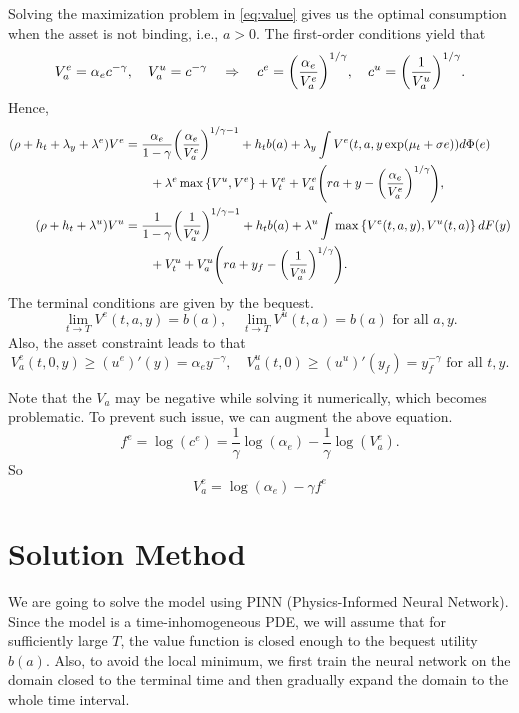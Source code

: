 \documentclass[a4paper, 12pt]{article}
\begin{document}
Solving the maximization problem in \cref{eq:value} gives us the optimal consumption 
when the asset is not binding, i.e., $a>0$. The first-order conditions yield that 
\begin{equation}
    V_a^e = \alpha_e c^{-\gamma}, \quad V_a^u = c^{-\gamma} 
    \quad \Rightarrow\quad 
    c^e = \pth{\frac{\alpha_e}{V^e_a}}^{1/\gamma}, \quad 
    c^u = \pth{\frac{1}{V^u_a}}^{1/\gamma}.
\end{equation}
Hence, 
\begin{align}
    (\rho + h_t + \lambda_y + \lambda^e)V^e &= \frac{\alpha_e}{1-\gamma}\pth{\frac{\alpha_e}{V^e_a}}^{1/\gamma - 1} + h_tb(a) + \lambda_y\int V^e(t,a,y\exp(\mu_t + \sigma e))d\Phi(e) \nonumber \\
    &\qquad + \lambda^e\max\set{V^u, V^e} + V^e_t + V^e_a\pth{ra + y - \pth{\frac{\alpha_e}{V^e_a}}^{1/\gamma}}, \label{eq:value_e}\\
    (\rho + h_t + \lambda^u)V^u &= \frac{1}{1-\gamma}\pth{\frac{1}{V^u_a}}^{1/\gamma - 1} + h_tb(a) + \lambda^u\int \max\set{V^e(t,a,y), V^u(t,a)}dF(y) \nonumber \\
    &\qquad + V^u_t + V^u_a\pth{ra + y_f - \pth{\frac{1}{V^u_a}}^{1/\gamma}}. \label{eq:value_u}
\end{align}
The terminal conditions are given by the bequest. 
\begin{equation}
    \lim_{t\to T} V^e(t,a,y) = b(a), \quad 
    \lim_{t\to T} V^u(t,a) = b(a) \text{ for all } a,y.
\end{equation}
Also, the asset constraint leads to that 
\begin{equation}
    V^e_a(t,0,y) \geq (u^e)'(y) = \alpha_e y^{-\gamma}, \quad
    V^u_a(t,0) \geq (u^u)'(y_f) = y_f^{-\gamma} \text{ for all } t,y. 
\end{equation}

Note that the $V_a$ may be negative while solving it numerically, 
which becomes problematic. To prevent such issue, we can augment the 
above equation. 
\begin{equation*}
    f^e = \log(c^e) = \frac{1}{\gamma}\log(\alpha_e) - \frac{1}{\gamma}\log(V^e_a). 
\end{equation*}
So 
\begin{equation*}
    V^e_a = \log(\alpha_e) - \gamma f^e
\end{equation*}

\section{Solution Method}
We are going to solve the model using PINN (Physics-Informed Neural Network). 
Since the model is a time-inhomogeneous PDE, we will assume that for sufficiently 
large $T$, the value function is closed enough to the bequest utility $b(a)$. Also, 
to avoid the local minimum, we first train the neural network on the domain closed 
to the terminal time and then gradually expand the domain to the whole time interval. 
\end{document}

